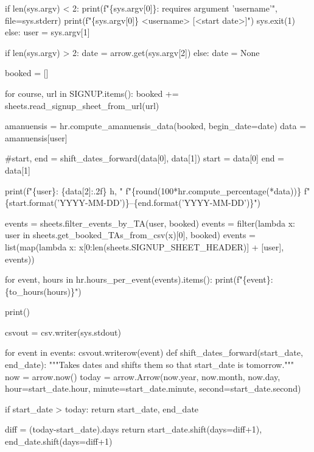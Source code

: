 if len(sys.argv) < 2:
    print(f"\{sys.argv[0]\}: requires argument 'username'",
          file=sys.stderr)
    print(f"\{sys.argv[0]\} <username> [<start date>]")
    sys.exit(1)
else:
    user = sys.argv[1]

if len(sys.argv) > 2:
    date = arrow.get(sys.argv[2])
else:
    date = None

booked = []

for course, url in SIGNUP.items():
    booked += sheets.read_signup_sheet_from_url(url)

amanuensis = hr.compute_amanuensis_data(booked,
                                        begin_date=date)
data = amanuensis[user]

#start, end = shift_dates_forward(data[0], data[1])
start = data[0]
end = data[1]

print(f"\{user\}: \{data[2]:.2f\} h, "
      f"\{round(100*hr.compute_percentage(*data))\}%
      f"\{start.format('YYYY-MM-DD')\}--\{end.format('YYYY-MM-DD')\}")

events = sheets.filter_events_by_TA(user, booked)
events = filter(lambda x: user in sheets.get_booked_TAs_from_csv(x)[0], booked)
events = list(map(lambda x: x[0:len(sheets.SIGNUP_SHEET_HEADER)] + [user], 
                  events))

for event, hours in hr.hours_per_event(events).items():
    print(f"\{event\}: \{to_hours(hours)\}")

print()

csvout = csv.writer(sys.stdout)

for event in events:
    csvout.writerow(event)
\nwendcode{}\plusendmoddef\nwstartdeflinemarkup{}\nwenddeflinemarkup
def shift_dates_forward(start_date, end_date):
  """Takes dates and shifts them so that start_date is tomorrow."""
  now = arrow.now()
  today = arrow.Arrow(now.year, now.month, now.day,
                      hour=start_date.hour, minute=start_date.minute,
                      second=start_date.second)

  if start_date > today:
      return start_date, end_date

  diff = (today-start_date).days
  return start_date.shift(days=diff+1), end_date.shift(days=diff+1)
\nwendcode{}

